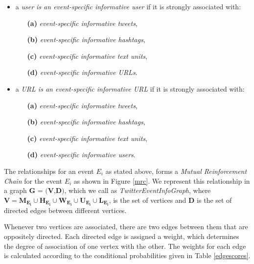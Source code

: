 \begin{itemize} 
\item a \textit{user is an event-specific informative user} if it is strongly associated with:
\begin{itemize}
\item[\textbf{(a)}] \textit{event-specific informative tweets}, 
\item[\textbf{(b)}] \textit{event-specific informative hashtags}, 
\item[\textbf{(c)}] \textit{event-specific informative text units},
\item[\textbf{(d)}] \textit{event-specific informative URLs}. 
\end{itemize}
\end{itemize}

\begin{itemize} \item a \textit{URL is an event-specific informative URL} if it is strongly associated with:
\begin{itemize}
\item[\textbf{(a)}] \textit{event-specific informative tweets}, 
\item[\textbf{(b)}] \textit{event-specific informative hashtags}, 
\item[\textbf{(c)}] \textit{event-specific informative text units},
\item[\textbf{(d)}] \textit{event-specific informative users}. 
\end{itemize}
\end{itemize}


The relationships for an event $\scriptstyle E_{i}$ as stated above, forms a \textit{Mutual Reinforcement Chain} \cite{wei2008query} for the event $E_{i}$ as shown in Figure \ref{mrc}. We represent this relationship in a graph $\textbf{G = (V,D)}$, which we call as \textit{TwitterEventInfoGraph}, where $\mathbf{V = M_{E_{i}} \cup H_{E_{i}} \cup W_{E_{i}} \cup U_{E_{i}} \cup L_{E_{i}}}$, is the set of vertices and $\mathbf{D}$ is the set of directed edges between different vertices. 

Whenever two vertices are associated, there are two edges between them that are oppositely directed. Each directed edge is assigned a weight, which determines the degree of association of one vertex with the other. The weights for each edge is calculated according to the conditional probabilities given in Table \ref{edgescores}. 

